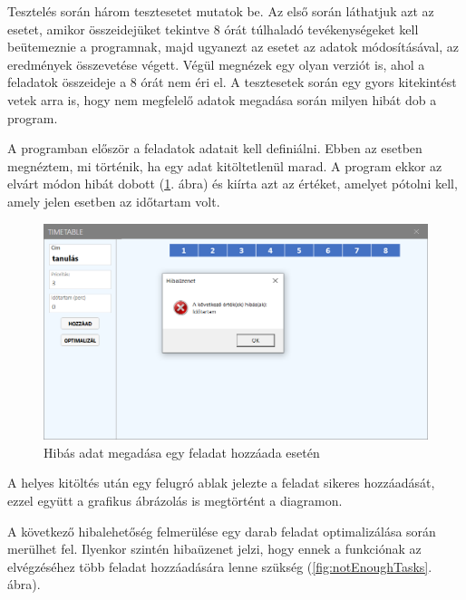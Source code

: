 
Tesztelés során három tesztesetet mutatok be. Az első során láthatjuk azt az esetet, amikor összeidejüket tekintve 8 órát túlhaladó tevékenységeket kell beütemeznie a programnak, majd ugyanezt az esetet az adatok módosításával, az eredmények összevetése végett. Végül megnézek egy olyan verziót is, ahol a feladatok összeideje a 8 órát nem éri el. A tesztesetek során egy gyors kitekintést vetek arra is, hogy nem megfelelő adatok megadása során milyen hibát dob a program.


A programban először a feladatok adatait kell definiálni. Ebben az esetben megnéztem, mi történik, ha egy adat kitöltetlenül marad. A program ekkor az elvárt módon hibát dobott (\ref{fig:durationFault}. ábra) és kiírta azt az értéket, amelyet pótolni kell, amely jelen esetben az időtartam volt.

\begin{figure}[h!]
	\centering
	\includegraphics[width=\textwidth]{images/test/durationFault.png}
	\caption{Hibás adat megadása egy feladat hozzáada esetén}
	\label{fig:durationFault}
\end{figure}

A helyes kitöltés után egy felugró ablak jelezte a feladat sikeres hozzáadását, ezzel együtt a grafikus ábrázolás is megtörtént a diagramon.

A következő hibalehetőség felmerülése egy darab feladat optimalizálása során merülhet fel. Ilyenkor szintén hibaüzenet jelzi, hogy ennek a funkciónak az elvégzéséhez több feladat hozzáadására lenne szükség (\ref{fig:notEnoughTasks}. ábra).

